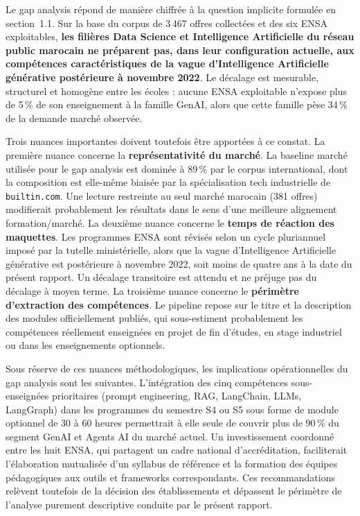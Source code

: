 \documentclass[11pt,a4paper,openany]{report}
\begin{document}
Le gap analysis r\'epond de mani\`ere chiffr\'ee \`a la question implicite formul\'ee en section~1.1. Sur la base du corpus de 3\,467 offres collect\'ees et des six ENSA exploitables, \textbf{les fili\`eres Data Science et Intelligence Artificielle du r\'eseau public marocain ne pr\'eparent pas, dans leur configuration actuelle, aux comp\'etences caract\'eristiques de la vague d'Intelligence Artificielle g\'en\'erative post\'erieure \`a novembre 2022}. Le d\'ecalage est mesurable, structurel et homog\`ene entre les \'ecoles : aucune ENSA exploitable n'expose plus de 5\,\% de son enseignement \`a la famille GenAI, alors que cette famille p\`ese 34\,\% de la demande march\'e observ\'ee.

Trois nuances importantes doivent toutefois \^etre apport\'ees \`a ce constat. La premi\`ere nuance concerne la \textbf{repr\'esentativit\'e du march\'e}. La baseline march\'e utilis\'ee pour le gap analysis est domin\'ee \`a 89\,\% par le corpus international, dont la composition est elle-m\^eme biais\'ee par la sp\'ecialisation tech industrielle de \texttt{builtin.com}. Une lecture restreinte au seul march\'e marocain (381 offres) modifierait probablement les r\'esultats dans le sens d'une meilleure alignement formation/march\'e. La deuxi\`eme nuance concerne le \textbf{temps de r\'eaction des maquettes}. Les programmes ENSA sont r\'evis\'es selon un cycle pluriannuel impos\'e par la tutelle minist\'erielle, alors que la vague d'Intelligence Artificielle g\'en\'erative est post\'erieure \`a novembre 2022, soit moins de quatre ans \`a la date du pr\'esent rapport. Un d\'ecalage transitoire est attendu et ne pr\'ejuge pas du d\'ecalage \`a moyen terme. La troisi\`eme nuance concerne le \textbf{p\'erim\`etre d'extraction des comp\'etences}. Le pipeline repose sur le titre et la description des modules officiellement publi\'es, qui sous-estiment probablement les comp\'etences r\'eellement enseign\'ees en projet de fin d'\'etudes, en stage industriel ou dans les enseignements optionnels.

Sous r\'eserve de ces nuances m\'ethodologiques, les implications op\'erationnelles du gap analysis sont les suivantes. L'int\'egration des cinq comp\'etences sous-enseign\'ees prioritaires (prompt engineering, RAG, LangChain, LLMs, LangGraph) dans les programmes du semestre S4 ou S5 sous forme de module optionnel de 30 \`a 60 heures permettrait \`a elle seule de couvrir plus de 90\,\% du segment GenAI et Agents AI du march\'e actuel. Un investissement coordonn\'e entre les huit ENSA, qui partagent un cadre national d'accr\'editation, faciliterait l'\'elaboration mutualis\'ee d'un syllabus de r\'ef\'erence et la formation des \'equipes p\'edagogiques aux outils et frameworks correspondants. Ces recommandations rel\`event toutefois de la d\'ecision des \'etablissements et d\'epassent le p\'erim\`etre de l'analyse purement descriptive conduite par le pr\'esent rapport.
\end{document}
